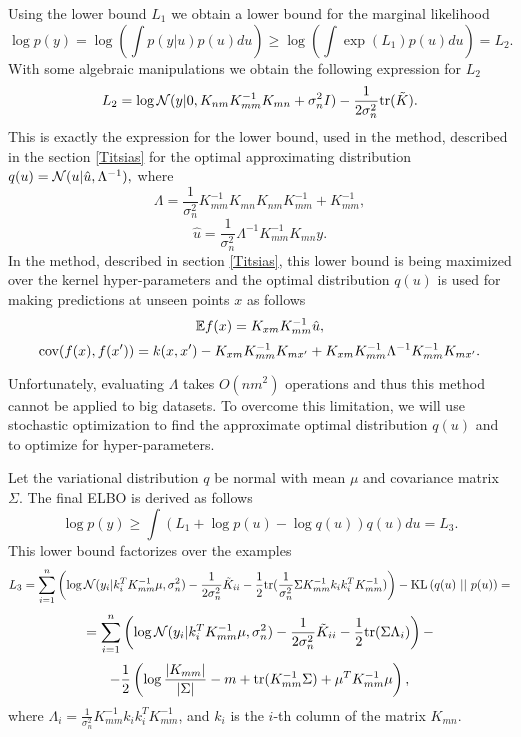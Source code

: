 \documentclass[12pt]{article}
\begin{document}
		Using the lower bound $L_1$ we obtain a lower bound for the marginal likelihood
		$$\log p(y) = \log \left( \int p(y|u) p(u) du\right) \ge \log \left( \int \exp(L_1) p(u) du\right) = L_2.$$
		With some algebraic manipulations we obtain the following expression for $L_2$
		$$L_2 = \log \mathcal{N}(y| 0, K_{nm} K_{mm}^{-1} K_{mn} + \sigma_n^2 I) - \frac 1 {2 \sigma_n^2} \mbox{tr} (\tilde K).$$
		This is exactly the expression for the lower bound, used in the method, described in the section \ref{Titsias} for the optimal approximating distribution $q(u) = \mathcal{N}(u |\hat u, \Lambda^{-1}),$ where
		$$\Lambda = \frac 1 {\sigma_n^2} K_{mm}^{-1} K_{mn} K_{nm} K_{mm}^{-1} + K_{mm}^{-1},$$
		$$\hat u = \frac 1 {\sigma_n^2} \Lambda^{-1} K_{mm}^{-1} K_{mn} y.$$
		In the method, described in section \ref{Titsias}, this lower bound is being maximized over the kernel hyper-parameters and the optimal distribution $q(u)$ is used for making predictions at unseen points $x$ as follows
		$$\mathbb{E} f(x) = K_{xm} K_{mm}^{-1} \hat u, $$
		$$\mbox{cov}(f(x), f(x')) = k(x, x') - K_{xm} K_{mm}^{-1} K_{mx'} + K_{xm} K_{mm}^{-1} \Lambda^{-1} K_{mm}^{-1} K_{mx'}.$$
		
		Unfortunately, evaluating $\Lambda$ takes $O(n m^2)$ operations and thus this method cannot be applied to big datasets. To overcome this limitation, we will use stochastic optimization to find the approximate optimal distribution $q(u)$ and to optimize for hyper-parameters. 
		
		Let the variational distribution $q$ be normal with mean $\mu$ and covariance matrix $\Sigma$. The final ELBO is derived as follows
		$$\log p(y) \ge \int \left( L_1 + \log p(u) - \log q(u)\right) q(u) du = L_3.$$
		This lower bound factorizes over the examples 
		$$L_3 = \sum_{i = 1}^{n} \left( \log \mathcal{N}(y_i | k_i^T K_{mm}^{-1} \mu, \sigma_n^2) - \frac 1 {2 \sigma_n^2} \tilde K_{ii} - \frac 1 2 \mbox{tr} (\frac 1 {\sigma_n^2} \Sigma K_{mm}^{-1} k_i k_i^T K_{mm}^{-1}) \right) - \mbox{KL}\left(q(u)\mbox{ || }p(u)\right) = $$
		$$ = \sum_{i = 1}^{n} \left( \log \mathcal{N}(y_i | k_i^T K_{mm}^{-1} \mu, \sigma_n^2) - \frac 1 {2 \sigma_n^2} \tilde K_{ii} - \frac 1 2 \mbox{tr} (\Sigma \Lambda_i) \right) - $$
		$$ -\frac 1 2 \left (\log \frac {|K_{mm}|} {|\Sigma|} - m + \mbox{tr}(K_{mm}^{-1} \Sigma) + \mu^T K_{mm}^{-1} \mu \right),$$
		where $\Lambda_i = \frac 1 {\sigma_n^2} K_{mm}^{-1} k_i k_i^T K_{mm}^{-1}$, and $k_i$ is the $i$-th column of the matrix $K_{mn}$.
		
\end{document}
